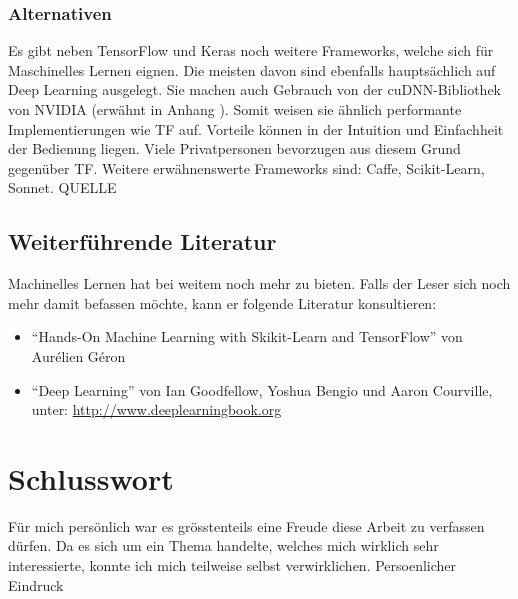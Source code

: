 \subsection*{Alternativen}
Es gibt neben TensorFlow und Keras noch weitere Frameworks, welche sich für
Maschinelles Lernen eignen. Die meisten davon sind ebenfalls hauptsächlich auf Deep
Learning ausgelegt. Sie machen auch Gebrauch von der cuDNN-Bibliothek
von NVIDIA (erwähnt in Anhang ). Somit weisen sie
ähnlich performante Implementierungen wie TF auf. Vorteile können in der
Intuition und Einfachheit der Bedienung liegen. Viele Privatpersonen bevorzugen
aus diesem Grund  gegenüber TF.
Weitere erwähnenswerte Frameworks sind: Caffe, Scikit-Learn, Sonnet.
QUELLE

\section*{Weiterführende Literatur}
Machinelles Lernen hat bei weitem noch mehr zu bieten. Falls der Leser sich noch
mehr damit befassen möchte, kann er folgende Literatur konsultieren:
\begin{itemize}
\item{``Hands-On Machine Learning with Skikit-Learn and TensorFlow'' von Aurélien Géron}
  \item{``Deep Learning'' von Ian Goodfellow, Yoshua Bengio und Aaron Courville,
      unter: \url{http://www.deeplearningbook.org}}
\end{itemize}


\chapter*{Schlusswort}

Für mich persönlich war es grösstenteils eine Freude diese Arbeit zu verfassen
dürfen. Da es sich um ein Thema handelte, welches mich wirklich sehr
interessierte, konnte ich mich teilweise selbst verwirklichen.
Persoenlicher Eindruck


